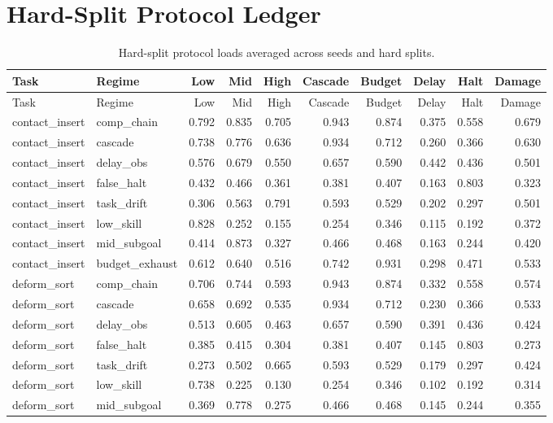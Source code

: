 \documentclass{article}
\begin{document}
\section{Hard-Split Protocol Ledger}
\begin{longtable}{@{}llrrrrrrrr@{}}
\caption{Hard-split protocol loads averaged across seeds and hard splits.}\\
\toprule
Task & Regime & Low & Mid & High & Cascade & Budget & Delay & Halt & Damage\\
\midrule
\endfirsthead
\toprule
Task & Regime & Low & Mid & High & Cascade & Budget & Delay & Halt & Damage\\
\midrule
\endhead
contact\_insert & comp\_chain & 0.792 & 0.835 & 0.705 & 0.943 & 0.874 & 0.375 & 0.558 & 0.679 \\
contact\_insert & cascade & 0.738 & 0.776 & 0.636 & 0.934 & 0.712 & 0.260 & 0.366 & 0.630 \\
contact\_insert & delay\_obs & 0.576 & 0.679 & 0.550 & 0.657 & 0.590 & 0.442 & 0.436 & 0.501 \\
contact\_insert & false\_halt & 0.432 & 0.466 & 0.361 & 0.381 & 0.407 & 0.163 & 0.803 & 0.323 \\
contact\_insert & task\_drift & 0.306 & 0.563 & 0.791 & 0.593 & 0.529 & 0.202 & 0.297 & 0.501 \\
contact\_insert & low\_skill & 0.828 & 0.252 & 0.155 & 0.254 & 0.346 & 0.115 & 0.192 & 0.372 \\
contact\_insert & mid\_subgoal & 0.414 & 0.873 & 0.327 & 0.466 & 0.468 & 0.163 & 0.244 & 0.420 \\
contact\_insert & budget\_exhaust & 0.612 & 0.640 & 0.516 & 0.742 & 0.931 & 0.298 & 0.471 & 0.533 \\
deform\_sort & comp\_chain & 0.706 & 0.744 & 0.593 & 0.943 & 0.874 & 0.332 & 0.558 & 0.574 \\
deform\_sort & cascade & 0.658 & 0.692 & 0.535 & 0.934 & 0.712 & 0.230 & 0.366 & 0.533 \\
deform\_sort & delay\_obs & 0.513 & 0.605 & 0.463 & 0.657 & 0.590 & 0.391 & 0.436 & 0.424 \\
deform\_sort & false\_halt & 0.385 & 0.415 & 0.304 & 0.381 & 0.407 & 0.145 & 0.803 & 0.273 \\
deform\_sort & task\_drift & 0.273 & 0.502 & 0.665 & 0.593 & 0.529 & 0.179 & 0.297 & 0.424 \\
deform\_sort & low\_skill & 0.738 & 0.225 & 0.130 & 0.254 & 0.346 & 0.102 & 0.192 & 0.314 \\
deform\_sort & mid\_subgoal & 0.369 & 0.778 & 0.275 & 0.466 & 0.468 & 0.145 & 0.244 & 0.355 \\

\end{longtable}
\end{document}

